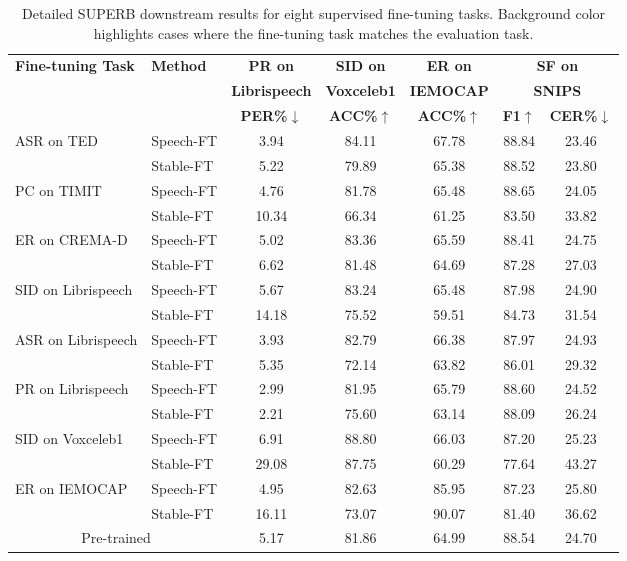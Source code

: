 \begin{table*}[ht!]
    \centering
    \begin{tabular}{l l c c c cc}
        \toprule
        \multirow{3}{*}{\textbf{Fine-tuning Task}} & \multirow{3}{*}{\textbf{Method}} & \textbf{PR on} & \textbf{SID on} & \textbf{ER on} & \multicolumn{2}{c}{\textbf{SF on}}\\
        & & \textbf{Librispeech} & \textbf{Voxceleb1} & \textbf{IEMOCAP} & \multicolumn{2}{c}{\textbf{SNIPS}} \\
        \cmidrule(r){3-7}
        & & \textbf{PER\%$\downarrow$} & \textbf{ACC\%$\uparrow$} & \textbf{ACC\%$\uparrow$} & \textbf{F1$\uparrow$} & \textbf{CER\%$\downarrow$}\\
        \midrule
        \multirow{2}{*}{ASR on TED} & Speech-FT & 3.94 & 84.11 & 67.78 & 88.84 & 23.46\\
        & Stable-FT & 5.22 & 79.89 & 65.38 & 88.52 & 23.80\\
        \midrule
        \multirow{2}{*}{PC on TIMIT} & Speech-FT & 4.76 & 81.78 & 65.48 & 88.65 & 24.05\\
        & Stable-FT & 10.34 & 66.34 & 61.25 & 83.50 & 33.82\\
        \midrule
        \multirow{2}{*}{ER on CREMA-D} & Speech-FT & 5.02 & 83.36 & 65.59 & 88.41 & 24.75\\
        & Stable-FT & 6.62 & 81.48 & 64.69 & 87.28 & 27.03\\
        \midrule
        \multirow{2}{*}{SID on Librispeech} & Speech-FT & 5.67 & 83.24 & 65.48 & 87.98 & 24.90\\
        & Stable-FT & 14.18 & 75.52 & 59.51 & 84.73 & 31.54\\
        \midrule
        \multirow{2}{*}{ASR on Librispeech} & Speech-FT & 3.93 & 82.79 & 66.38 & 87.97 & 24.93\\
        & Stable-FT & 5.35 & 72.14 & 63.82 & 86.01 & 29.32\\
        \midrule
        \multirow{2}{*}{PR on Librispeech} & Speech-FT & \cellcolor{gray!20} 2.99 & 81.95 & 65.79 & 88.60 & 24.52\\
        & Stable-FT & \cellcolor{gray!20} 2.21 & 75.60 & 63.14 & 88.09 & 26.24\\
        \midrule
        \multirow{2}{*}{SID on Voxceleb1} & Speech-FT & 6.91 & \cellcolor{gray!20} 88.80 & 66.03 & 87.20 & 25.23\\
        & Stable-FT & 29.08 & \cellcolor{gray!20} 87.75 & 60.29 & 77.64 & 43.27\\
        \midrule
        \multirow{2}{*}{ER on IEMOCAP} & Speech-FT & 4.95 & 82.63 & \cellcolor{gray!20} 85.95 & 87.23 & 25.80\\
        & Stable-FT & 16.11 & 73.07 & \cellcolor{gray!20} 90.07 & 81.40 & 36.62\\
        \midrule
        \midrule
        \multicolumn{2}{c}{Pre-trained} & 5.17 & 81.86 & 64.99 & 88.54 & 24.70\\
        \bottomrule
    \end{tabular}
    \caption{Detailed SUPERB downstream results for eight supervised fine-tuning tasks. Background color highlights cases where the fine-tuning task matches the evaluation task.}
    \label{tab:supervised-finetune}
\end{table*}